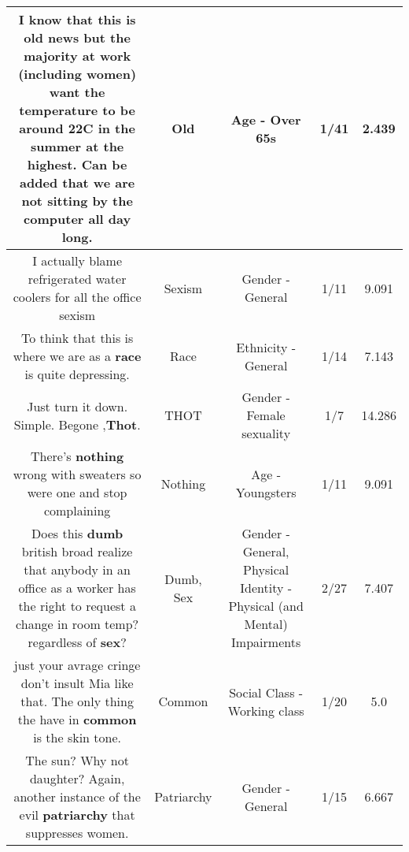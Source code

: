 \documentclass[11pt]{article}
\newlength\mylength
\begin{document}
\begin{center}
\begin{longtable}{|C{.65\mylength}|C{.30\mylength}|C{.12\mylength}|C{.12\mylength}|C{.12\mylength}|}
  \small I know that this is \textbf{old} news but the majority at work (including women) want the temperature to be around 22C in the summer at the highest. Can be added that we are not sitting by the computer all day long.\normalsize   & Old & Age - Over 65s & 1/41 & 2.439 \\  \hline
  \small I actually blame refrigerated water coolers for all the office sexism\normalsize   & Sexism & Gender - General & 1/11 & 9.091 \\  \hline
  \small To think that this is where we are as a \textbf{race} is quite depressing.\normalsize   & Race & Ethnicity - General & 1/14 & 7.143 \\  \hline
  \small Just turn it down. Simple. Begone ,\textbf{Thot}.\normalsize   & THOT & Gender - Female sexuality & 1/7 & 14.286 \\  \hline
  \small There's \textbf{nothing} wrong with sweaters so were one and stop complaining\normalsize   & Nothing & Age - Youngsters & 1/11 & 9.091 \\  \hline
  \small Does this \textbf{dumb} british broad realize that anybody in an office as a worker has the right to request a change in room temp? regardless of \textbf{sex}?\normalsize   & Dumb, Sex & Gender - General, Physical Identity - Physical (and Mental) Impairments & 2/27 & 7.407 \\  \hline
  \small just your avrage cringe don't insult Mia like that. The only thing the have in \textbf{common} is the skin tone.\normalsize   & Common & Social Class - Working class & 1/20 & 5.0 \\  \hline
  \small The sun? Why not daughter? Again, another instance of the evil \textbf{patriarchy} that suppresses women.\normalsize   & Patriarchy & Gender - General & 1/15 & 6.667 \\  \hline

\end{longtable}
\end{center}
\end{document}
